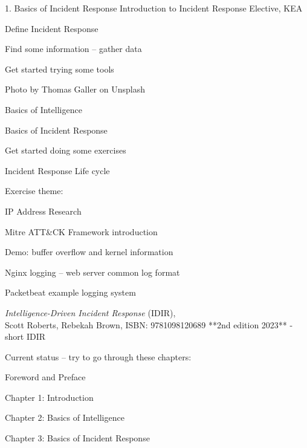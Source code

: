 \documentclass[Screen16to9,17pt]{foils}
\begin{document}
\mytitlepage
{1. Basics of Incident Response}
{Introduction to Incident Response Elective, KEA}




\begin{list2}
\item Define Incident Response
\item Find some information -- gather data
\item Get started trying  some tools
\end{list2}

{\hfill \small Photo by Thomas Galler on Unsplash}


\begin{list2}
\item Basics of Intelligence
\item Basics of Incident Response
\item Get started doing some exercises
\item Incident Response Life cycle
\end{list2}

Exercise theme:
\begin{list2}
\item IP Address Research
\item Mitre ATT\&CK Framework introduction
\item Demo: buffer overflow and kernel information
\item Nginx logging -- web server common log format
\item Packetbeat example logging system
\end{list2}


\emph{Intelligence-Driven Incident Response} (IDIR),\\
Scott Roberts, Rebekah Brown, ISBN: 9781098120689 **2nd edition 2023** - short IDIR

Current status -- try to go through these chapters:
\begin{list2}
\item Foreword and Preface
\item Chapter 1: Introduction
\item Chapter 2: Basics of Intelligence
\item Chapter 3: Basics of Incident Response
\end{list2}
\end{document}
